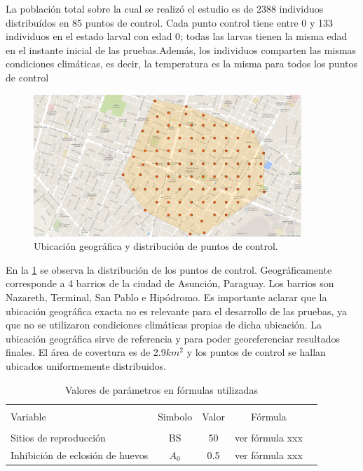 
La población total sobre la cual se realizó el estudio es de 2388 individuos
distribuídos en 85 puntos de control. Cada punto control tiene entre 0 y 133
individuos en el estado larval con edad 0; todas las larvas tienen la misma edad
en el instante inicial de las pruebas.Además, los individuos comparten
las mismas condiciones climáticas, es decir, la temperatura es la misma
para todos los puntos de control \\

\begin{figure}
\centering
\includegraphics[width=0.9\textwidth]{./capitulo-6/graphics/puntoscontroldistribuido.png}
\caption{\label{fig:distribucion-puntos}Ubicación geográfica y distribución de puntos de control.}
\end{figure}


En la \ref{fig:distribucion-puntos} se observa la distribución de los puntos de control. Geográficamente
corresponde a 4 barrios de la ciudad de Asunción, Paraguay. Los barrios son Nazareth,
Terminal, San Pablo e Hipódromo. Es importante aclarar que la ubicación geográfica
exacta no es relevante para el desarrollo de las pruebas, ya que no se utilizaron
condiciones climáticas propias de dicha ubicación. La ubicación geográfica sirve
de referencia y para poder georeferenciar resultados finales. El área de covertura
es de 2.9$km^2$ y los puntos de control se hallan ubicados uniformemente distribuidos.\\


\begin{table}
    \begin{center}
        \caption{ \label{tab:valores-formulas} Valores de parámetros en fórmulas utilizadas}
        \begin{tabular}{p{3cm} c c c c}
            \hline \\
            Variable & Simbolo & Valor & Fórmula \\
            \hline
            \hline \\
            Sitios de reproducción &  BS & 50 & ver fórmula xxx\\
            Inhibición de eclosión de huevos & $A_{0}$ & 0.5 & ver fórmula xxx\\
        \end{tabular}
    \end{center}
\end{table}

